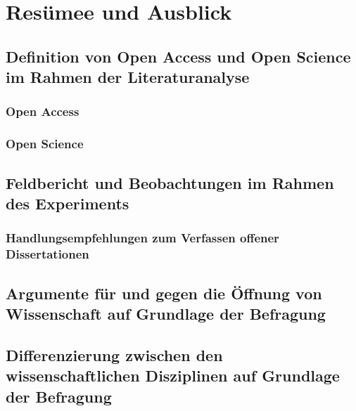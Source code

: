 \chapter{Resümee und Ausblick}

\section{Definition von Open Access und Open Science im Rahmen der Literaturanalyse}
\subsection{Open Access}
\subsection{Open Science}
\section{Feldbericht und Beobachtungen im Rahmen des Experiments}
\subsection{Handlungsempfehlungen zum Verfassen offener Dissertationen}
\section{Argumente für und gegen die Öffnung von Wissenschaft auf Grundlage der Befragung}
\section{Differenzierung zwischen den wissenschaftlichen Disziplinen auf Grundlage der Befragung}